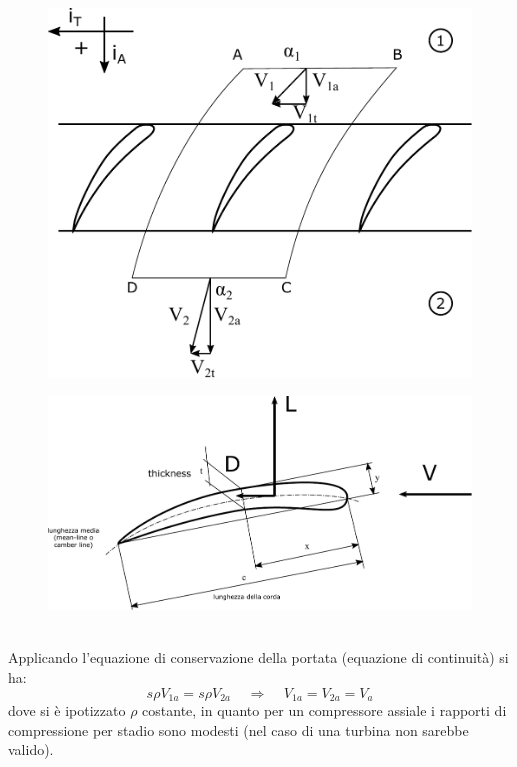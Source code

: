 \begin{figure}
\centering
\begin{minipage}{.4\textwidth}
  \centering
  \includegraphics[width=.95\linewidth]{fig/schiera1.pdf}
  \label{fig:schiera1}
\end{minipage}%
\begin{minipage}{.6\textwidth}
  \centering
  \includegraphics[width=.85\linewidth]{fig/LDref.pdf}
  \label{fig:LDref}
\end{minipage}
\end{figure}
\\Applicando l'equazione di conservazione della portata (equazione di continuità) si ha:
\begin{equation}
s \rho V_{1a} = s \rho V_{2a} \;\;\;\; \Rightarrow \;\;\;\; V_{1a} = V_{2a} = V_a
\end{equation}
dove si è ipotizzato $\rho$ costante, in quanto per un compressore assiale i rapporti di compressione per stadio sono modesti (nel caso di una turbina non sarebbe valido).\\
